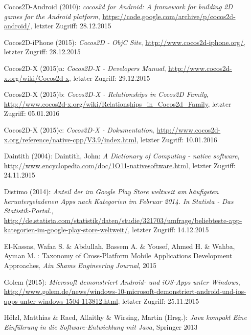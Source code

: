 \begin{thebibliography}{}
Cocos2D-Android (2010): \emph{cocos2d for Android: A framework for building 2D games for the Android platform},
\url{https://code.google.com/archive/p/cocos2d-android/}, letzter Zugriff: 28.12.2015

Cocos2D-iPhone (2015): \emph{Cocos2D - ObjC Site},
\url{http://www.cocos2d-iphone.org/}, letzter Zugriff: 28.12.2015

Cocos2D-X (2015)a: \emph{Cocos2D-X - Developers Manual},
\url{http://www.cocos2d-x.org/wiki/Cocos2d-x}, letzter Zugriff: 29.12.2015

Cocos2D-X (2015)b: \emph{Cocos2D-X - Relationships in Cocos2D Family},
\url{http://www.cocos2d-x.org/wiki/Relationships_in_Cocos2d_Family}, letzter Zugriff: 05.01.2016

Cocos2D-X (2015)c: \emph{Cocos2D-X - Dokumentation},
\url{http://www.cocos2d-x.org/reference/native-cpp/V3.9/index.html}, letzter Zugriff: 10.01.2016

Daintith (2004): Daintith, John: \emph{A Dictionary of Computing - native software},
\url{http://www.encyclopedia.com/doc/1O11-nativesoftware.html}, letzter Zugriff: 24.11.2015

Distimo (2014): \emph{Anteil der im Google Play Store weltweit am häufigsten heruntergeladenen Apps nach Kategorien im Februar 2014. In Statista - Das Statistik-Portal.},
\url{http://de.statista.com/statistik/daten/studie/321703/umfrage/beliebteste-app-kategorien-im-google-play-store-weltweit/}, letzter Zugriff: 14.12.2015

El-Kassas, Wafaa S. \& Abdullah, Bassem A. \&  Yousef, Ahmed H. \&  Wahba, Ayman M. :
\glqq Taxonomy of Cross-Platform Mobile Applications Development Approaches\grqq, 
\emph{Ain Shams Engineering Journal}, 2015

Golem (2015): \emph{Microsoft demonstriert Android- und iOS-Apps unter Windows},
\url{http://www.golem.de/news/windows-10-microsoft-demonstriert-android-und-ios-apps-unter-windows-1504-113812.html}, letzter Zugriff: 25.11.2015

Hölzl, Matthias \& Raed, Allaithy \& Wirsing, Martin (Hrsg.): 
\emph{Java kompakt Eine Einführung in die Software-Entwicklung
	mit Java}, Springer 2013


\end{thebibliography}
